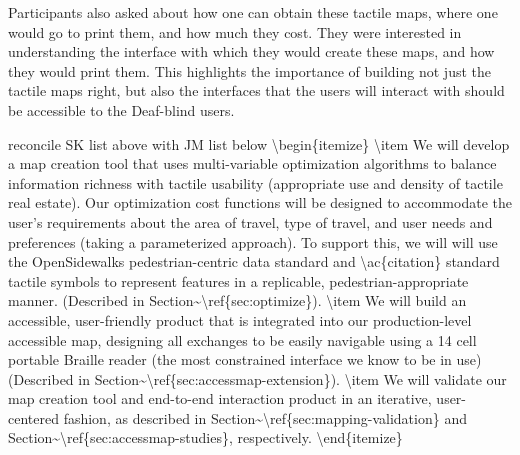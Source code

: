Participants also asked about how one can obtain these tactile maps, where one would go to print them, and how much they cost. They were interested in understanding the interface with which they would create these maps, and how they would print them. This highlights the importance of building not just the tactile maps right, but also the interfaces that the users will interact with should be accessible to the Deaf-blind users.



\ac{
reconcile SK list above with JM list below
\begin{itemize}
\item We will develop a map creation tool that uses multi-variable optimization algorithms to balance information richness with tactile usability (appropriate use and density of tactile real estate). Our optimization cost functions will be designed to accommodate the user’s requirements about the area of travel, type of travel, and user needs and preferences (taking a parameterized approach).  To support this, we will will use the OpenSidewalks pedestrian-centric data standard and \ac{citation} standard tactile symbols to represent features in a replicable, pedestrian-appropriate manner. (Described in Section~\ref{sec:optimize}).
\item  We will build an accessible, user-friendly product that is integrated into our  production-level accessible map, designing all exchanges to be easily navigable  using a 14 cell portable Braille reader (the most constrained interface we know to be in use)  (Described in Section~\ref{sec:accessmap-extension}).
\item We will validate our map creation tool and end-to-end interaction product in an iterative, user-centered fashion, as described in Section~\ref{sec:mapping-validation} and Section~\ref{sec:accessmap-studies}, respectively. 
\end{itemize}
}
